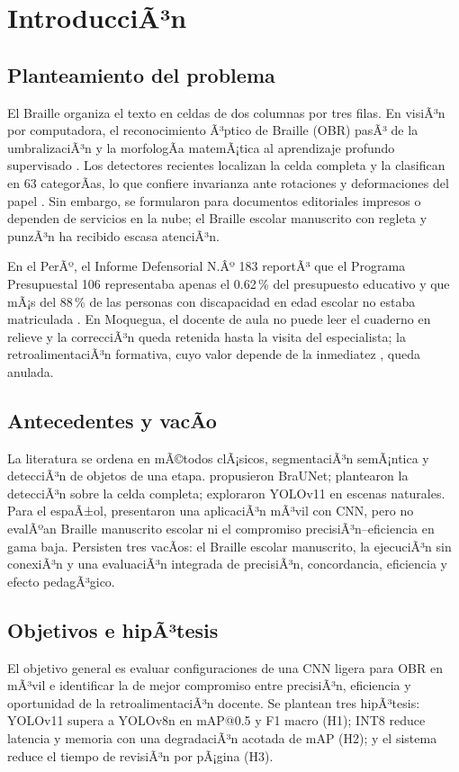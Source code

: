 \section{IntroducciÃ³n}

\subsection{Planteamiento del problema}
El Braille organiza el texto en celdas de dos columnas por tres filas. En visiÃ³n
por computadora, el reconocimiento Ã³ptico de Braille (OBR) pasÃ³ de la
umbralizaciÃ³n y la morfologÃ­a matemÃ¡tica \parencite{antonacopoulos2004} al
aprendizaje profundo supervisado \parencite{li2020}. Los detectores recientes
localizan la celda completa y la clasifican en 63 categorÃ­as, lo que confiere
invarianza ante rotaciones y deformaciones del papel
\parencite{ovodov2021,sun2025}. Sin embargo, se formularon para documentos
editoriales impresos o dependen de servicios en la nube; el Braille escolar
manuscrito con regleta y punzÃ³n ha recibido escasa atenciÃ³n.

En el PerÃº, el Informe Defensorial N.Âº 183 reportÃ³ que el Programa Presupuestal
106 representaba apenas el 0.62\,\% del presupuesto educativo y que mÃ¡s del
88\,\% de las personas con discapacidad en edad escolar no estaba matriculada
\parencite{defensoria2019}. En Moquegua, el docente de aula no puede leer el
cuaderno en relieve y la correcciÃ³n queda retenida hasta la visita del
especialista; la retroalimentaciÃ³n formativa, cuyo valor depende de la
inmediatez \parencite{hattie2007}, queda anulada.

\subsection{Antecedentes y vacÃ­o}
La literatura se ordena en mÃ©todos clÃ¡sicos, segmentaciÃ³n semÃ¡ntica y detecciÃ³n
de objetos de una etapa. \textcite{li2020} propusieron BraUNet; \textcite{ovodov2021}
plantearon la detecciÃ³n sobre la celda completa; \textcite{sun2025} exploraron
YOLOv11 en escenas naturales. Para el espaÃ±ol, \textcite{fuentes2026} presentaron
una aplicaciÃ³n mÃ³vil con CNN, pero no evalÃºan Braille manuscrito escolar ni el
compromiso precisiÃ³n--eficiencia en gama baja. Persisten tres vacÃ­os: el Braille
escolar manuscrito, la ejecuciÃ³n sin conexiÃ³n y una evaluaciÃ³n integrada de
precisiÃ³n, concordancia, eficiencia y efecto pedagÃ³gico.

\subsection{Objetivos e hipÃ³tesis}
El objetivo general es evaluar configuraciones de una CNN ligera para OBR en
mÃ³vil e identificar la de mejor compromiso entre precisiÃ³n, eficiencia y
oportunidad de la retroalimentaciÃ³n docente. Se plantean tres hipÃ³tesis:
YOLOv11 supera a YOLOv8n en mAP@0.5 y F1 macro (H1); INT8 reduce latencia y
memoria con una degradaciÃ³n acotada de mAP (H2); y el sistema reduce el tiempo de
revisiÃ³n por pÃ¡gina (H3).
